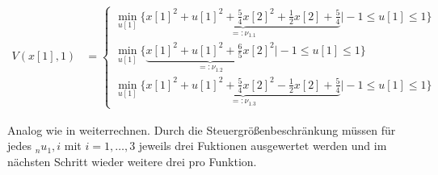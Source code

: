 \begin{exmp}
\begin{enumerate}[label=(S\arabic*)]
\begin{align*}
	V\left(x[1],1\right) & = \left\{\begin{array}{l}
	\min\limits_{u[1]}\bigg\{\underbrace{x[1]^2+u[1]^2+\frac54x[2]^2+\frac12x[2]+\frac54}_{=:\nu_{1.1}} \bigg| -1\leq u[1]\leq 1\bigg\}\\
	\min\limits_{u[1]}\bigg\{\underbrace{x[1]^2+u[1]^2+\frac65x[2]^2}_{=:\nu_{1.2}} \bigg| -1\leq u[1]\leq 1\bigg\}\\
	\min\limits_{u[1]}\bigg\{\underbrace{x[1]^2+u[1]^2+\frac54x[2]^2-\frac12x[2]+\frac54}_{=:\nu_{1.3}} \bigg| -1\leq u[1]\leq 1\bigg\}
	\end{array}\right.
\end{align*}
\end{enumerate}
Analog wie in  weiterrechnen. Durch die Steuergrößenbeschränkung müssen für jedes $_nu_1,i$ mit $i=1,\ldots,3$
jeweils drei Fuktionen ausgewertet werden und im nächsten Schritt wieder weitere drei pro Funktion.
\end{exmp}

